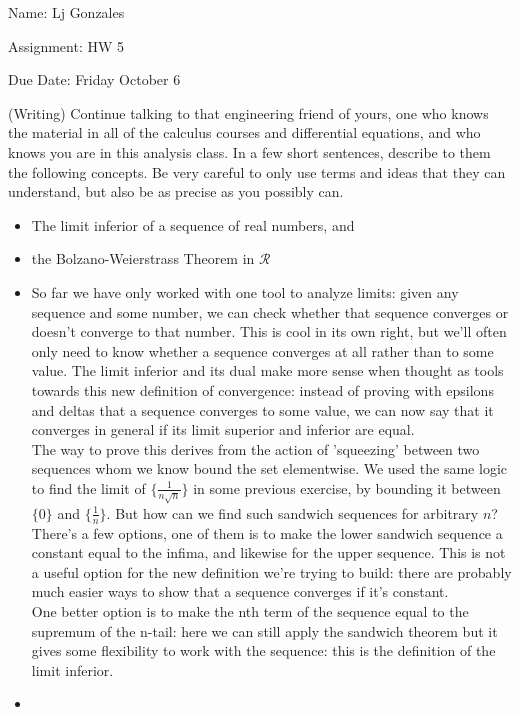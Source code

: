 \documentclass[11 pt]{article}
\begin{document}
    Name: Lj Gonzales

    Assignment: HW 5 

    Due Date: Friday October 6
    \break
\begin{problem}
	(Writing) Continue talking to that engineering friend of yours, one who knows
the material in all of the calculus courses and differential equations, and who knows
you are in this analysis class. In a few short sentences, describe to them the following
concepts. Be very careful to only use terms and ideas that they can understand, but
also be as precise as you possibly can.
\begin{itemize}
	\item The limit inferior of a sequence of real numbers, and
	\item the Bolzano-Weierstrass Theorem in $\mathcal{R}$
\end{itemize}
\end{problem}
\begin{solution}
	\begin{itemize}
	\item	So far we have only worked with one tool to analyze limits: given any sequence and some number, we can check whether that sequence converges or doesn't converge to that number. This is cool in its own right, but we'll often only need to know whether a sequence converges at all rather than to some value. The limit inferior and its dual make more sense when thought as tools towards this new definition of convergence: instead of proving with epsilons and deltas that a sequence converges to some value, we can now say that it converges in general if its limit superior and inferior are equal.\\
		The way to prove this derives from the action of 'squeezing' between two sequences whom we know bound the set elementwise. We used the same logic to find the limit of $\{\frac{1}{n\sqrt{n}}\}$ in some previous exercise, by bounding it between $\{0\}$ and $\{\frac{1}{n}\}$. But how can we find such sandwich sequences for arbitrary $n$?
		There's a few options, one of them is to make the lower sandwich sequence a constant equal to the infima, and likewise for the upper sequence. 
		This is not a useful option for the new definition we're trying to build: there are probably much easier ways to show that a sequence converges if it's constant.\\
	One better option is to make the nth term of the sequence equal to the supremum of the n-tail: here we can still apply the sandwich theorem but it gives some flexibility to work with the sequence: this is the definition of the limit inferior.
	\item  
	\end{itemize}
\end{solution} 
\end{document}
